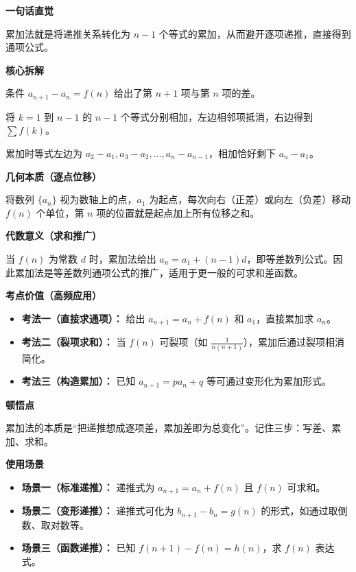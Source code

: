 \begin{explanationbox}
	\textbf{\textcolor{CExplanation}{一句话直觉}}

	累加法就是将递推关系转化为 $n-1$ 个等式的累加，从而避开逐项递推，直接得到通项公式。

	\medskip
	\textbf{\textcolor{CExplanation}{核心拆解}}
	\begin{description}[style=nextline, leftmargin=2.8em, labelsep=0.5em, itemsep=0.45em]
		\item[\textbf{要点一（差式递推）：}] 条件 $a_{n+1}-a_n=f(n)$ 给出了第 $n+1$ 项与第 $n$ 项的差。
		\item[\textbf{要点二（累加消项）：}] 将 $k=1$ 到 $n-1$ 的 $n-1$ 个等式分别相加，左边相邻项抵消，右边得到 $\sum f(k)$。
		\item[\textbf{要点三（下标规律）：}] 累加时等式左边为 $a_2-a_1, a_3-a_2,\dots, a_n-a_{n-1}$，相加恰好剩下 $a_n-a_1$。
	\end{description}

	\medskip
	\textbf{\textcolor{CExplanation}{几何本质（逐点位移）}}

	将数列 $\{a_n\}$ 视为数轴上的点，$a_1$ 为起点，每次向右（正差）或向左（负差）移动 $f(n)$ 个单位，第 $n$ 项的位置就是起点加上所有位移之和。

	\medskip
	\textbf{\textcolor{CExplanation}{代数意义（求和推广）}}

	当 $f(n)$ 为常数 $d$ 时，累加法给出 $a_n=a_1+(n-1)d$，即等差数列公式。因此累加法是等差数列通项公式的推广，适用于更一般的可求和差函数。

	\medskip
	\textbf{\textcolor{CExplanation}{考点价值（高频应用）}}
	\begin{itemize}[leftmargin=*, itemsep=0.5em, topsep=0.4em]
		\item \textbf{考法一（直接求通项）：} 给出 $a_{n+1}=a_n+f(n)$ 和 $a_1$，直接累加求 $a_n$。
		\item \textbf{考法二（裂项求和）：} 当 $f(n)$ 可裂项（如 $\frac{1}{n(n+1)}$），累加后通过裂项相消简化。
		\item \textbf{考法三（构造累加）：} 已知 $a_{n+1}=pa_n+q$ 等可通过变形化为累加形式。
	\end{itemize}

	\medskip
	\textbf{\textcolor{CExplanation}{顿悟点}}

	累加法的本质是“把递推想成逐项差，累加差即为总变化”。记住三步：写差、累加、求和。

	\medskip
	\textbf{\textcolor{CExplanation}{使用场景}}
	\begin{itemize}[leftmargin=*, itemsep=0.5em, topsep=0.4em]
		\item \textbf{场景一（标准递推）：} 递推式为 $a_{n+1}=a_n+f(n)$ 且 $f(n)$ 可求和。
		\item \textbf{场景二（变形递推）：} 递推式可化为 $b_{n+1}-b_n=g(n)$ 的形式，如通过取倒数、取对数等。
		\item \textbf{场景三（函数递推）：} 已知 $f(n+1)-f(n)=h(n)$，求 $f(n)$ 表达式。
	\end{itemize}
\end{explanationbox}
